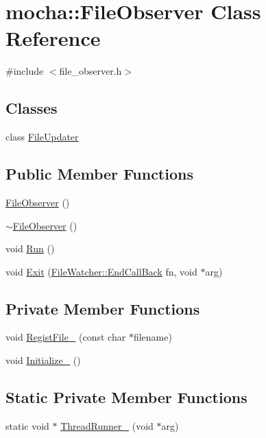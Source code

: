 \hypertarget{classmocha_1_1_file_observer}{
\section{mocha::FileObserver Class Reference}
\label{classmocha_1_1_file_observer}
}


{\ttfamily \#include $<$file\_\-observer.h$>$}

\subsection*{Classes}
\begin{DoxyCompactItemize}
\item 
class \hyperlink{classmocha_1_1_file_observer_1_1_file_updater}{FileUpdater}
\end{DoxyCompactItemize}
\subsection*{Public Member Functions}
\begin{DoxyCompactItemize}
\item 
\hyperlink{classmocha_1_1_file_observer_a336a46a78bdb9952f12db2325b4353cd}{FileObserver} ()
\item 
\hyperlink{classmocha_1_1_file_observer_a8816635e00b2ddf824cb33c33037d4d3}{$\sim$FileObserver} ()
\item 
void \hyperlink{classmocha_1_1_file_observer_aa0cf63fff2f93c6aa3ed80bbb4f41332}{Run} ()
\item 
void \hyperlink{classmocha_1_1_file_observer_ad2ca9cfba7edbf7ce76f7f4199d7edba}{Exit} (\hyperlink{classmocha_1_1_file_watcher_af774b8dd436b9f8929506466533831b9}{FileWatcher::EndCallBack} fn, void $\ast$arg)
\end{DoxyCompactItemize}
\subsection*{Private Member Functions}
\begin{DoxyCompactItemize}
\item 
void \hyperlink{classmocha_1_1_file_observer_a6fa51f827d8023577887bbe2cab8921f}{RegistFile\_\-} (const char $\ast$filename)
\item 
void \hyperlink{classmocha_1_1_file_observer_a536e202ce36dc014076538ee43422021}{Initialize\_\-} ()
\end{DoxyCompactItemize}
\subsection*{Static Private Member Functions}
\begin{DoxyCompactItemize}
\item 
static void $\ast$ \hyperlink{classmocha_1_1_file_observer_a20113d9556e7b1c5372cbc72dd8ae4d7}{ThreadRunner\_\-} (void $\ast$arg)
\end{DoxyCompactItemize}
